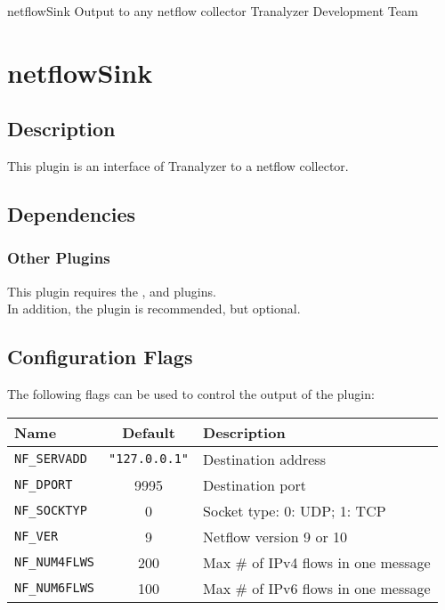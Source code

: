 \documentclass[documentation]{subfiles}
\begin{document}
\trantitle
    {netflowSink}
    {Output to any netflow collector}
    {Tranalyzer Development Team}

\section{netflowSink}\label{s:netflowSink}

\subsection{Description}
This plugin is an interface of Tranalyzer to a netflow collector.

\subsection{Dependencies}

\subsubsection{Other Plugins}
This plugin requires the ,  and  plugins.\\
In addition, the  plugin is recommended, but optional.

\subsection{Configuration Flags}
The following flags can be used to control the output of the plugin:

\begin{longtable}{lcl}
    \toprule
    {\bf Name} & {\bf Default} & {\bf Description}\\
    \midrule\endhead%
    {\tt NF\_SERVADD}   & {\tt "127.0.0.1"} & Destination address\\
    {\tt NF\_DPORT}     & 9995              & Destination port\\
    {\tt NF\_SOCKTYP}   & 0                 & Socket type: 0: UDP; 1: TCP\\
    {\tt NF\_VER}       & 9                 & Netflow version 9 or 10\\
    {\tt NF\_NUM4FLWS}  & 200               & Max \# of IPv4 flows in one message\\
    {\tt NF\_NUM6FLWS}  & 100               & Max \# of IPv6 flows in one message\\
    \bottomrule
\end{longtable}
\end{document}
